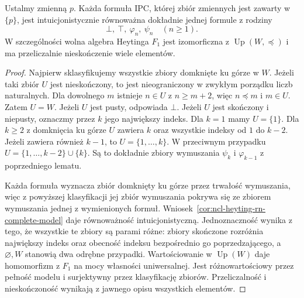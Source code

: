 \begin{twierdzenie}
\label{thm:ncl-heyting-rieger-nishimura}
Ustalmy zmienną $p$. Każda formuła IPC, której
zbiór zmiennych jest zawarty w $\{p\}$,
jest intuicjonistycznie równoważna dokładnie jednej
formule z rodziny
\[
 \bot,\ \top,\ \varphi_n,\ \psi_n\quad(n\geq1).
\]
W szczególności wolna algebra Heytinga $F_1$
jest izomorficzna z $\operatorname{Up}(W,\preceq)$
i ma przeliczalnie nieskończenie wiele elementów.
\end{twierdzenie}
\begin{proof}
Najpierw sklasyfikujemy wszystkie zbiory domknięte
ku górze w $W$. Jeżeli taki zbiór $U$ jest
nieskończony, to jest nieograniczony w zwykłym
porządku liczb naturalnych. Dla dowolnego $m$
istnieje $n\in U$ z $n\geq m+2$,
więc $n\preceq m$ i $m\in U$. Zatem $U=W$.
Jeżeli $U$ jest pusty, odpowiada $\bot$.
Jeżeli $U$ jest skończony i niepusty, oznaczmy
przez $k$ jego największy indeks.
Dla $k=1$ mamy $U=\{1\}$.
Dla $k\geq2$ z domknięcia ku górze
$U$ zawiera $k$ oraz wszystkie indeksy
od $1$ do $k-2$. Jeżeli zawiera również $k-1$,
to $U=\{1,\ldots,k\}$.
W przeciwnym przypadku
$U=\{1,\ldots,k-2\}\cup\{k\}$.
Są to dokładnie zbiory wymuszania $\psi_k$
i $\varphi_{k-1}$ z poprzedniego lematu.

Każda formuła wyznacza zbiór domknięty ku górze
przez trwałość wymuszania, więc z powyższej
klasyfikacji jej zbiór wymuszania pokrywa się
ze zbiorem wymuszania jednej z wymienionych
formuł. Wniosek~\ref{cor:ncl-heyting-rn-complete-model}
daje równoważność intuicjonistyczną.
Jednoznaczność wynika z tego, że wszystkie te
zbiory są parami różne: zbiory skończone rozróżnia
największy indeks oraz obecność indeksu
bezpośrednio go poprzedzającego, a $\varnothing,W$
stanowią dwa odrębne przypadki.
Wartościowanie w $\operatorname{Up}(W)$ daje
homomorfizm z $F_1$ na mocy własności uniwersalnej.
Jest różnowartościowy przez pełność modelu
i surjektywny przez klasyfikację zbiorów.
Przeliczalność i nieskończoność wynikają
z jawnego opisu wszystkich elementów.
\end{proof}


